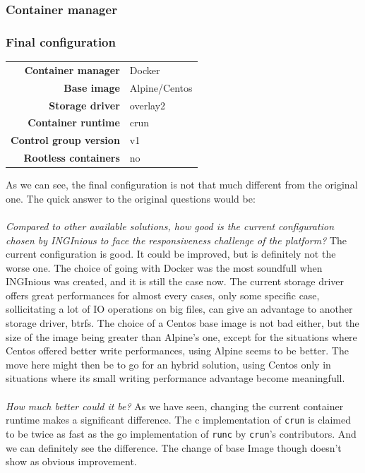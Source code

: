 \subsubsection{Container manager}

\subsubsection{Final configuration}

\begin{center}
\begin{tabular}{rl}
  \textbf{Container manager} & Docker \\
  \textbf{Base image} & Alpine/Centos \\
  \textbf{Storage driver} & overlay2 \\
  \textbf{Container runtime} & crun \\
  \textbf{Control group version} & v1 \\
  \textbf{Rootless containers} & no \\
\end{tabular}
\end{center}

As we can see, the final configuration is not that much different from the original one.  The quick answer to the original questions would be:
\paragraph{}\textit{Compared to other available solutions, how good is the current configuration chosen by INGInious to face the responsiveness challenge of the platform?}  The current configuration is good.  It could be improved, but is definitely not the worse one.  The choice of going with Docker was the most soundfull when INGInious was created, and it is still the case now.  The current storage driver offers great performances for almost every cases, only some specific case, sollicitating a lot of IO operations on big files, can give an advantage to another storage driver, btrfs.  The choice of a Centos base image is not bad either, but the size of the image being greater than Alpine's one, except for the situations where Centos offered better write performances, using Alpine seems to be better.  The move here might then be to go for an hybrid solution, using Centos only in situations where its small writing performance advantage become meaningfull.  
\paragraph{}\textit{How much better could it be?}  As we have seen, changing the current container runtime makes a significant difference.  The c implementation of \texttt{crun} is claimed to be twice as fast as the go implementation of \texttt{runc} by \texttt{crun}'s contributors.  And we can definitely see the difference.  The change of base Image though doesn't show as obvious improvement.
